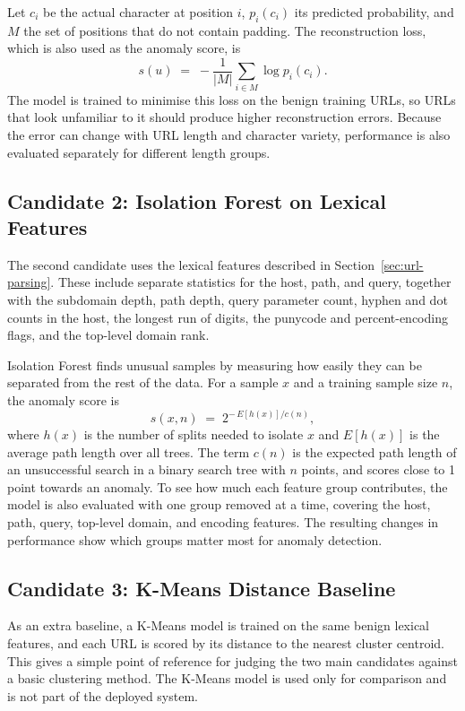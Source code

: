 \documentclass{FastFyp}
\begin{document}
Let $c_i$ be the actual character at position $i$, $p_i(c_i)$ its predicted probability, and $M$ the set of positions that do not contain padding. The reconstruction loss, which is also used as the anomaly score, is
\begin{equation}
s(u) \;=\; -\frac{1}{|M|}\sum_{i\in M} \log p_i(c_i).
\end{equation}
The model is trained to minimise this loss on the benign training URLs, so URLs that look unfamiliar to it should produce higher reconstruction errors. Because the error can change with URL length and character variety, performance is also evaluated separately for different length groups.

\subsection{Candidate 2: Isolation Forest on Lexical Features}
The second candidate uses the lexical features described in Section~\ref{sec:url-parsing}. These include separate statistics for the host, path, and query, together with the subdomain depth, path depth, query parameter count, hyphen and dot counts in the host, the longest run of digits, the punycode and percent-encoding flags, and the top-level domain rank.

Isolation Forest finds unusual samples by measuring how easily they can be separated from the rest of the data. For a sample $x$ and a training sample size $n$, the anomaly score is
\begin{equation}
s(x,n) \;=\; 2^{-\,E[h(x)]/c(n)},
\end{equation}
where $h(x)$ is the number of splits needed to isolate $x$ and $E[h(x)]$ is the average path length over all trees. The term $c(n)$ is the expected path length of an unsuccessful search in a binary search tree with $n$ points, and scores close to 1 point towards an anomaly. To see how much each feature group contributes, the model is also evaluated with one group removed at a time, covering the host, path, query, top-level domain, and encoding features. The resulting changes in performance show which groups matter most for anomaly detection.

\subsection{Candidate 3: K-Means Distance Baseline}
As an extra baseline, a K-Means model is trained on the same benign lexical features, and each URL is scored by its distance to the nearest cluster centroid. This gives a simple point of reference for judging the two main candidates against a basic clustering method. The K-Means model is used only for comparison and is not part of the deployed system.
\end{document}
